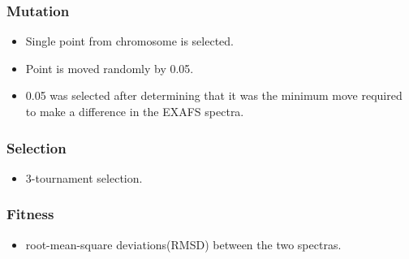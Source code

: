 \documentclass[]{beamer}
\begin{document}
\begin{frame}
  \frametitle{Mutation}

  \begin{itemize}
    \item Single point from chromosome is selected.
    \item Point is moved randomly by 0.05.
    \item 0.05 was selected after determining that it was the minimum move required to make a difference in the EXAFS spectra.
  \end{itemize}

\end{frame}

\begin{frame}
  \frametitle{Selection}

  \begin{itemize}
    \item 3-tournament selection.
  \end{itemize}

\end{frame}

\begin{frame}
  \frametitle{Fitness}

  \begin{itemize}
    \item root-mean-square deviations(RMSD) between the two spectras.
  \end{itemize}

  \begin{figure}
  \begin{center}
  \end{center}
  \end{figure}

\end{frame}
\end{document}
